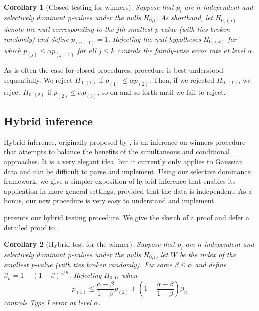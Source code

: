 \documentclass{article}
\newtheorem{corollary}{Corollary}
\begin{document}
\begin{corollary}[Closed testing for winners]
    \label{cor:cond_closed}
    Suppose that $p_i$ are $n$ independent and selectively dominant p-values under the nulls $H_{0, i}$. As shorthand, let $H_{0, (j)}$ denote the null corresponding to the $j$th smallest p-value (with ties broken randomly) and define $p_{(n+1)} = 1$.  Rejecting the null hypotheses $H_{0, (k)}$ for which $p_{(j)} \leq \alpha p_{(j-1)} $ for all $j \leq k$ controls the family-wise error rate at level $\alpha$. 
\end{corollary}

As is often the case for closed procedures,  procedure is best understood sequentially. We reject $H_{0, (1)}$ if $p_{(1)} \leq \alpha p_{(2)}$. Then, if we rejected  $H_{0, (1)}$, we reject $H_{0, (2)}$ if $p_{(2)} \leq \alpha p_{(3)}$, so on and so forth until we fail to reject. 

\subsection{Hybrid inference}

Hybrid inference, originally proposed by \cite{Andrews2023}, is an inference on winners procedure that attempts to balance the benefits of the simultaneous and conditional approaches. It is a very elegant idea, but it currently only applies to Gaussian data and can be difficult to parse and implement. Using our selective dominance framework, we give a simpler exposition of hybrid inference that enables its application in more general settings, provided that the data is independent. As a bonus, our new procedure is very easy to understand and implement.

 presents our hybrid testing procedure. We give the sketch of a proof and defer a detailed proof to . 

\begin{corollary}[Hybrid test for the winner]
    \label{cor:hyb}
    Suppose that $p_i$ are $n$ independent and selectively dominant p-values under the nulls $H_{0, i}$, let $W$ be the index of the smallest p-value (with ties broken randomly). Fix some $\beta \leq \alpha$ and define $\beta_n  = 1 - (1-\beta)^{1/n}$. Rejecting $H_{0, W}$ when 
    \begin{equation}
        \label{eq:hybrid_cutoff_thm}
        p_{(1)} \leq \frac{\alpha-\beta}{1-\beta}p_{(2)}  + \left(1 - \frac{\alpha - \beta}{1 - \beta}\right) \beta_n
    \end{equation} 
    controls Type I error at level $\alpha$. 
\end{corollary}
\end{document}
